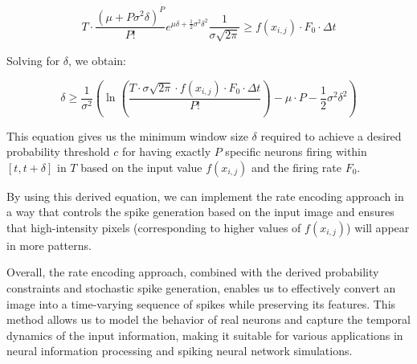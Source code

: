 \[
T \cdot \frac{(\mu + P\sigma^2\delta)^P}{P!} e^{\mu\delta + \frac{1}{2}\sigma^2 \delta^2} \frac{1}{\sigma \sqrt{2\pi}} \geq f(x_{i,j}) \cdot F_0 \cdot \Delta t
\]

Solving for \(\delta\), we obtain:

\[
\delta \geq \frac{1}{\sigma^2}\left(\ln\left(\frac{T \cdot \sigma \sqrt{2\pi} \cdot f(x_{i,j}) \cdot F_0 \cdot \Delta t}{P!}\right) - \mu \cdot P - \frac{1}{2}\sigma^2 \delta^2\right)
\]

This equation gives us the minimum window size \(\delta\) required to achieve a desired probability threshold \(c\) for having exactly \(P\) specific neurons firing within \([t, t + \delta]\) in \(T\) based on the input value \(f(x_{i,j})\) and the firing rate \(F_0\).

By using this derived equation, we can implement the rate encoding approach in a way that controls the spike generation based on the input image and ensures that high-intensity pixels (corresponding to higher values of \(f(x_{i,j})\)) will appear in more patterns.

Overall, the rate encoding approach, combined with the derived probability constraints and stochastic spike generation, enables us to effectively convert an image into a time-varying sequence of spikes while preserving its features. This method allows us to model the behavior of real neurons and capture the temporal dynamics of the input information, making it suitable for various applications in neural information processing and spiking neural network simulations.